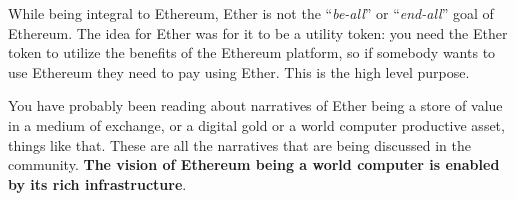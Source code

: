 While being integral to Ethereum, Ether is not the ``\emph{be-all}'' or
``\emph{end-all}'' goal of Ethereum. The idea for Ether was for it to be
a utility token: you need the Ether token to utilize the benefits of the
Ethereum platform, so if somebody wants to use Ethereum they need to pay
using Ether. This is the high level purpose.

You have probably been reading about narratives of Ether being a store
of value in a medium of exchange, or a digital gold or a world computer
productive asset, things like that. These are all the narratives that
are being discussed in the community. \textbf{The vision of Ethereum
being a world computer is enabled by its rich infrastructure}.
